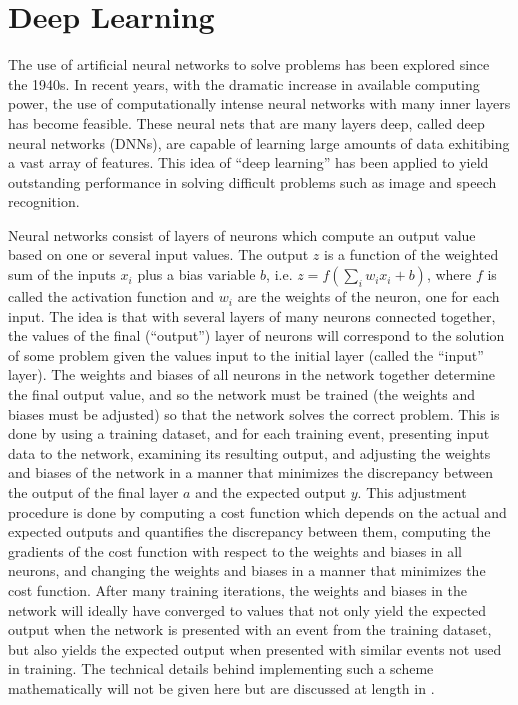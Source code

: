 \documentclass[a4paper,11pt]{article}
\begin{document}

\section{Deep Learning}
The use of artificial neural networks to solve problems has been explored since the 1940s.  In recent years, with the dramatic increase in available computing power, the use of computationally
intense neural networks with many inner layers has become feasible.  These neural nets that are many layers deep, called deep neural networks (DNNs), are capable of learning large
amounts of data exhitibing a vast array of features.  This idea of ``deep learning'' has been applied to yield outstanding performance in solving difficult problems such as image and 
speech recognition.

Neural networks consist of layers of neurons which compute an output value based on one or several input values.  The output $z$ is a function of the weighted sum of the inputs $x_{i}$ plus a bias variable $b$, i.e. $z = f(\sum_{i}w_{i}x_{i} + b)$, where $f$ is called the activation function and $w_{i}$ are the weights of the neuron, one for each input.  The idea is that
with several layers of many neurons connected together, the values of the final (``output'') layer of neurons will correspond to the solution of some problem given the values input to the
initial layer (called the ``input'' layer).  The weights and biases of all neurons in the network together determine the final output value, and so the network must be trained (the weights and
biases must be adjusted) so that the network solves the correct problem.  This is done by using a training dataset, and for each training event, presenting input data to the network, 
examining its resulting output, and adjusting the weights and biases of the network in a manner that minimizes the discrepancy between the output of the final layer $a$ and the expected 
output $y$.  This adjustment procedure is done by computing a cost function which depends on the actual and expected outputs and quantifies the discrepancy between them, computing 
the gradients of the cost function with respect to the weights and biases in all neurons, and changing the weights and biases in a manner that minimizes the cost function.  After many training
iterations, the weights and biases in the network will ideally have converged to values that not only yield the expected output when the network is presented with an event from the training
dataset, but also yields the expected output when presented with similar events not used in training.  The technical
details behind implementing such a scheme mathematically will not be given here but are discussed at length in \cite{Nielsen_2016}.
\end{document}
